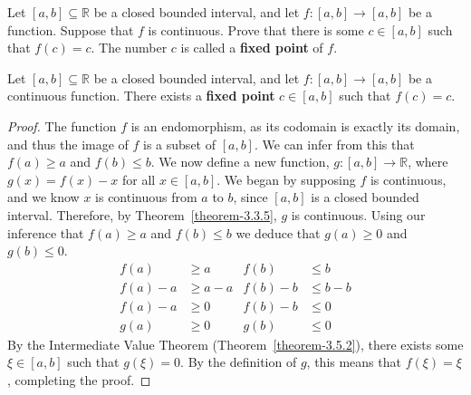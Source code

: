 \begin{exercise}
	Let $\left[ a, b \right] \subseteq \mathbb{R}$ be a closed bounded interval, and let $f:\left[ a, b \right] \to \left[ a, b \right]$ be a function. Suppose that $f$ is continuous. Prove that there is some $c \in \left[ a, b \right]$ such that $f\left(c\right) = c$. The number $c$ is called a \textbf{fixed point} of $f$.
\end{exercise}
\begin{proposition}
	Let $\left[ a, b \right] \subseteq \mathbb{R}$ be a closed bounded interval, and let $f:\left[a,b\right]\to\left[a,b\right]$ be a continuous function. There exists a \textbf{fixed point} $c \in \left[a,b\right]$ such that $f\left(c\right)=c$.
\end{proposition}
\begin{proof}
	The function $f$ is an endomorphism, as its codomain is exactly its domain, and thus the image of $f$ is a subset of $\left[ a, b \right]$. We can infer from this that $f\left(a\right) \geq a$ and $f\left(b\right) \leq b$.
	\newline\newline
	We now define a new function, $g : \left[ a, b \right] \to \mathbb{R}$, where $g\left(x\right) = f\left(x\right) - x$ for all $x \in \left[ a, b \right]$.\supercite{binmore_mathematical_analysis} We began by supposing $f$ is continuous, and we know $x$ is continuous from $a$ to $b$, since $\left[ a, b \right]$ is a closed bounded interval. Therefore, by Theorem~\ref{theorem-3.3.5}, $g$ is continuous.
	\newline\newline
	Using our inference that $f\left(a\right) \geq a$ and $f\left(b\right) \leq b$ we deduce that $g\left(a\right) \geq 0$ and $g\left(b\right) \leq 0$.
	\begin{align*}
	f\left(a\right) &\geq a & f\left(b\right) &\leq b \\
	f\left(a\right) - a &\geq a - a & f\left(b\right) - b &\leq b - b \\
	f\left(a\right) - a &\geq 0 & f\left(b\right) - b &\leq 0 \\
	g\left(a\right) &\geq 0 & g\left(b\right) &\leq 0
	\end{align*}
	By the Intermediate Value Theorem (Theorem~\ref{theorem-3.5.2}), there exists some $\xi \in \left[ a, b \right]$ such that $g\left(\xi\right)=0$. By the definition of $g$, this means that $f\left(\xi\right)=\xi$, completing the proof.
\end{proof}
